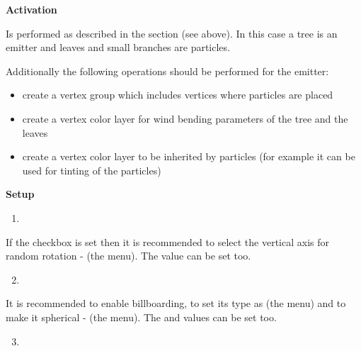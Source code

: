 \documentclass[a4paper,12pt,oneside]{sphinxmanual}
\begin{document}
\textbf{Activation}

Is performed as described in the  section (see above). In this case a tree is an emitter and leaves and small branches are particles.

Additionally the following operations should be performed for the emitter:
\begin{itemize}
\item {} 
create a vertex group which includes vertices where particles are placed

\item {} 
create a vertex color layer for wind bending parameters of the tree and the leaves

\item {} 
create a vertex color layer to be inherited by particles (for example it can be used for tinting of the particles)

\end{itemize}

\textbf{Setup}
\begin{enumerate}
\item {} 

\end{enumerate}

If the  checkbox is set then it is recommended to select the vertical axis for random rotation -  (the  menu). The  value can be set too.
\begin{enumerate}
\setcounter{enumi}{1}
\item {} 

\end{enumerate}

It is recommended to enable billboarding, to set its type as  (the  menu) and to make it spherical -  (the  menu). The  and  values can be set too.
\begin{enumerate}
\setcounter{enumi}{2}
\item {} 

\end{enumerate}
\end{document}
